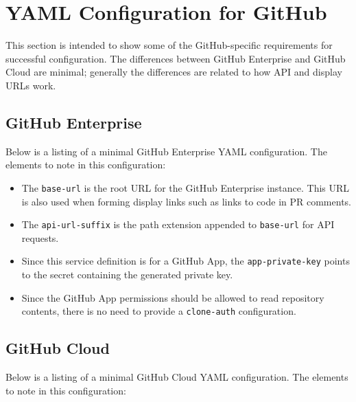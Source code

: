 \FloatBarrier

\section{\cxoneflowtext\space YAML Configuration for GitHub}\label{sec:gh-yaml-config}

This section is intended to show some of the GitHub-specific requirements for successful configuration.  The differences
between GitHub Enterprise and GitHub Cloud are minimal; generally the differences are related to how API and display URLs
work.

\subsection{GitHub Enterprise}

Below is a listing of a minimal GitHub Enterprise YAML configuration.  The elements to note in this
configuration:

\begin{itemize}
    \item The \texttt{base-url} is the root URL for the GitHub Enterprise instance.  This URL is also used
    when forming display links such as links to code in PR comments.
    \item The \texttt{api-url-suffix} is the path extension appended to \texttt{base-url} for API requests.
    \item Since this service definition is for a GitHub App, the \texttt{app-private-key} points to the secret
    containing the generated private key.
    \item Since the GitHub App permissions should be allowed to read repository contents, there is no need
    to provide a \texttt{clone-auth} configuration.
\end{itemize}



\subsection{GitHub Cloud}

Below is a listing of a minimal GitHub Cloud YAML configuration.  The elements to note in this
configuration:

